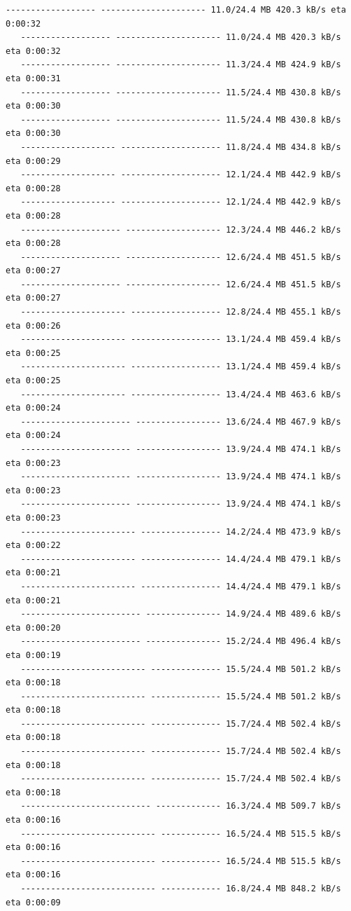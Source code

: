 \documentclass[11pt]{article}
\begin{document}
\begin{Verbatim}[commandchars=\\\{\}]
   ------------------ --------------------- 11.0/24.4 MB 420.3 kB/s eta 0:00:32
   ------------------ --------------------- 11.0/24.4 MB 420.3 kB/s eta 0:00:32
   ------------------ --------------------- 11.3/24.4 MB 424.9 kB/s eta 0:00:31
   ------------------ --------------------- 11.5/24.4 MB 430.8 kB/s eta 0:00:30
   ------------------ --------------------- 11.5/24.4 MB 430.8 kB/s eta 0:00:30
   ------------------- -------------------- 11.8/24.4 MB 434.8 kB/s eta 0:00:29
   ------------------- -------------------- 12.1/24.4 MB 442.9 kB/s eta 0:00:28
   ------------------- -------------------- 12.1/24.4 MB 442.9 kB/s eta 0:00:28
   -------------------- ------------------- 12.3/24.4 MB 446.2 kB/s eta 0:00:28
   -------------------- ------------------- 12.6/24.4 MB 451.5 kB/s eta 0:00:27
   -------------------- ------------------- 12.6/24.4 MB 451.5 kB/s eta 0:00:27
   --------------------- ------------------ 12.8/24.4 MB 455.1 kB/s eta 0:00:26
   --------------------- ------------------ 13.1/24.4 MB 459.4 kB/s eta 0:00:25
   --------------------- ------------------ 13.1/24.4 MB 459.4 kB/s eta 0:00:25
   --------------------- ------------------ 13.4/24.4 MB 463.6 kB/s eta 0:00:24
   ---------------------- ----------------- 13.6/24.4 MB 467.9 kB/s eta 0:00:24
   ---------------------- ----------------- 13.9/24.4 MB 474.1 kB/s eta 0:00:23
   ---------------------- ----------------- 13.9/24.4 MB 474.1 kB/s eta 0:00:23
   ---------------------- ----------------- 13.9/24.4 MB 474.1 kB/s eta 0:00:23
   ----------------------- ---------------- 14.2/24.4 MB 473.9 kB/s eta 0:00:22
   ----------------------- ---------------- 14.4/24.4 MB 479.1 kB/s eta 0:00:21
   ----------------------- ---------------- 14.4/24.4 MB 479.1 kB/s eta 0:00:21
   ------------------------ --------------- 14.9/24.4 MB 489.6 kB/s eta 0:00:20
   ------------------------ --------------- 15.2/24.4 MB 496.4 kB/s eta 0:00:19
   ------------------------- -------------- 15.5/24.4 MB 501.2 kB/s eta 0:00:18
   ------------------------- -------------- 15.5/24.4 MB 501.2 kB/s eta 0:00:18
   ------------------------- -------------- 15.7/24.4 MB 502.4 kB/s eta 0:00:18
   ------------------------- -------------- 15.7/24.4 MB 502.4 kB/s eta 0:00:18
   ------------------------- -------------- 15.7/24.4 MB 502.4 kB/s eta 0:00:18
   -------------------------- ------------- 16.3/24.4 MB 509.7 kB/s eta 0:00:16
   --------------------------- ------------ 16.5/24.4 MB 515.5 kB/s eta 0:00:16
   --------------------------- ------------ 16.5/24.4 MB 515.5 kB/s eta 0:00:16
   --------------------------- ------------ 16.8/24.4 MB 848.2 kB/s eta 0:00:09

\end{Verbatim}
\end{document}
